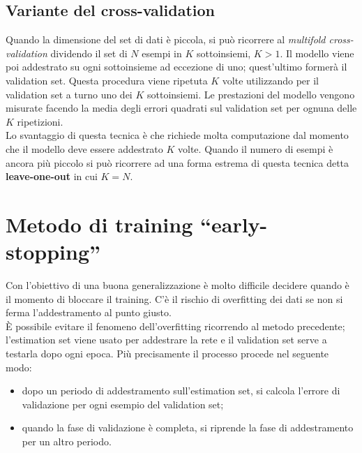\subsection{Variante del cross-validation} %
\label{sub:variante_del_cross_validation}
Quando la dimensione del set di dati è piccola, si può ricorrere al \emph{multifold cross-validation} dividendo il set di $N$ esempi in $K$ sottoinsiemi, $K>1$. Il modello viene poi addestrato su ogni sottoinsieme ad eccezione di uno; quest'ultimo formerà il validation set. Questa procedura viene ripetuta $K$ volte utilizzando per il validation set a turno uno dei $K$ sottoinsiemi. Le prestazioni del modello vengono misurate facendo la media degli errori quadrati sul validation set per ognuna delle $K$ ripetizioni.\\
Lo svantaggio di questa tecnica è che richiede molta computazione dal momento che il modello deve essere addestrato $K$ volte.
Quando il numero di esempi è ancora più piccolo si può ricorrere ad una forma estrema di questa tecnica detta \textbf{leave-one-out} in cui $K=N$.

\newpage

\section{Metodo di training “early-stopping”} %
\label{sec:metodo_di_training_early_stopping_}
Con l’obiettivo di una buona generalizzazione è molto difficile decidere quando è il momento di bloccare il training. C'è il rischio di overfitting dei dati se non si ferma l'addestramento al punto giusto.\\
È possibile evitare il fenomeno dell'overfitting ricorrendo al metodo precedente; l'estimation set viene usato per addestrare la rete e il validation set serve a testarla dopo ogni epoca. Più precisamente il processo procede nel seguente modo:
\begin{itemize}
	\item dopo un periodo di addestramento sull'estimation set, si calcola l'errore di validazione per ogni esempio del validation set;
	\item quando la fase di validazione è completa, si riprende la fase di addestramento per un altro periodo.
\end{itemize}

